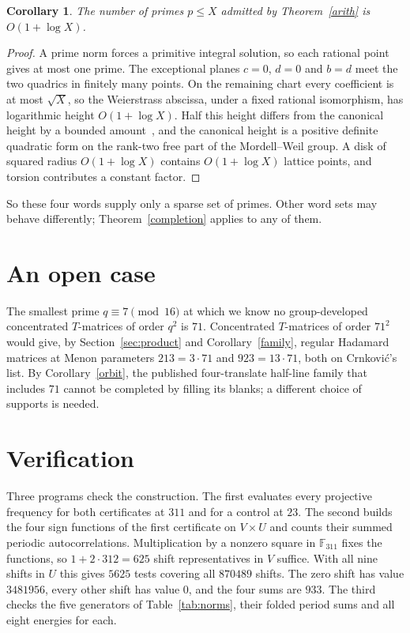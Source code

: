\documentclass[11pt]{article}
\newtheorem{corollary}[theorem]{Corollary}
\theoremstyle{remark}
\newcommand{\F}{\mathbb F}
\begin{document}
\begin{corollary}\label{fewprimes}
The number of primes $p\le X$ admitted by Theorem~\ref{arith} is $O(1+\log X)$.
\end{corollary}
\begin{proof}
A prime norm forces a primitive integral solution, so each rational point gives at most one prime. The exceptional planes $c=0$, $d=0$ and $b=d$ meet the two quadrics in finitely many points. On the remaining chart every coefficient is at most $\sqrt X$, so the Weierstrass abscissa, under a fixed rational isomorphism, has logarithmic height $O(1+\log X)$. Half this height differs from the canonical height by a bounded amount~\cite[Theorem~VIII.9.3]{Sil}, and the canonical height is a positive definite quadratic form on the rank-two free part of the Mordell--Weil group. A disk of squared radius $O(1+\log X)$ contains $O(1+\log X)$ lattice points, and torsion contributes a constant factor.
\end{proof}

So these four words supply only a sparse set of primes. Other word sets may behave differently; Theorem~\ref{completion} applies to any of them.

\section{An open case}
The smallest prime $q\equiv7\pmod{16}$ at which we know no group-developed concentrated $T$-matrices of order $q^2$ is $71$. Concentrated $T$-matrices of order $71^2$ would give, by Section~\ref{sec:product} and Corollary~\ref{family}, regular Hadamard matrices at Menon parameters $213=3\cdot71$ and $923=13\cdot71$, both on Crnkovi\'c's list. By Corollary~\ref{orbit}, the published four-translate half-line family that includes $71$ cannot be completed by filling its blanks; a different choice of supports is needed.

\section*{Verification}
Three programs check the construction. The first evaluates every projective frequency for both certificates at $311$ and for a control at $23$. The second builds the four sign functions of the first certificate on $V\times U$ and counts their summed periodic autocorrelations. Multiplication by a nonzero square in $\F_{311}$ fixes the functions, so $1+2\cdot312=625$ shift representatives in $V$ suffice. With all nine shifts in $U$ this gives $5625$ tests covering all $870489$ shifts. The zero shift has value $3481956$, every other shift has value $0$, and the four sums are $933$. The third checks the five generators of Table~\ref{tab:norms}, their folded period sums and all eight energies for each.
\end{document}
